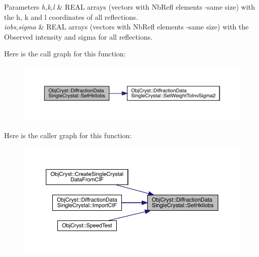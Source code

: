 \begin{DoxyParams}{Parameters}
{\em h,k,l} & R\+E\+AL arrays (vectors with Nb\+Refl elements -\/same size) with the h, k and l coordinates of all reflections. \\
\hline
{\em iobs,sigma} & R\+E\+AL arrays (vectors with Nb\+Refl elements -\/same size) with the Observed intensity and sigma for all reflections. \\
\hline
\end{DoxyParams}
Here is the call graph for this function\+:
\nopagebreak
\begin{figure}[H]
\begin{center}
\leavevmode
\includegraphics[width=350pt]{class_obj_cryst_1_1_diffraction_data_single_crystal_a0d13ab934c60c9bd0aebbb285a92c5cb_cgraph}
\end{center}
\end{figure}
Here is the caller graph for this function\+:
\nopagebreak
\begin{figure}[H]
\begin{center}
\leavevmode
\includegraphics[width=350pt]{class_obj_cryst_1_1_diffraction_data_single_crystal_a0d13ab934c60c9bd0aebbb285a92c5cb_icgraph}
\end{center}
\end{figure}
\mbox{\label{class_obj_cryst_1_1_diffraction_data_single_crystal_a68395af92ab6a91a6ecc6e7633495b75}} 
